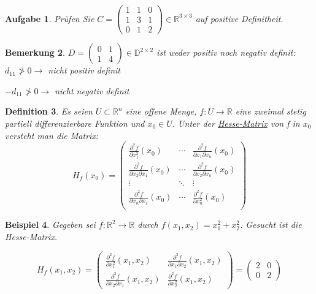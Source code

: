 \documentclass[12pt,a4paper]{scrreprt}
\newtheorem{defi}{Definition}[section]
\newtheorem{bemerkung}[defi]{Bemerkung}
\newtheorem{beispiel}[defi]{Beispiel}
\newtheorem{aufg}[defi]{Aufgabe}
\begin{document}
\begin{aufg}
	Prüfen Sie $C=\begin{pmatrix}
	1 & 1 & 0 \\ 1 & 3 & 1 \\ 0 & 1 & 2
	\end{pmatrix} \in \mathbb{R}^{3\times3}$ auf positive Definitheit.
\end{aufg}

\begin{bemerkung}
	$D=\begin{pmatrix}
	0 & 1 \\ 1 & 4
	\end{pmatrix} \in \mathbb{D}^{2\times2}$ ist weder positiv noch negativ definit: $d_{11}\not>0\to$ nicht positiv definit
	
	$-d_{11}\not>0\to$ nicht negativ definit
\end{bemerkung}

\begin{defi}
	Es seien $U\subset\mathbb{R}^n$ eine offene Menge, $f:U\to\mathbb{R}$ eine zweimal stetig partiell differenzierbare Funktion und $x_0\in U$. Unter der \underline{Hesse-Matrix} von f in $x_0$ versteht man die Matrix: \[H_f(x_0)=\begin{pmatrix}
	\frac{\partial^2 f}{\partial x_1^2}(x_0) & \cdots & \frac{\partial^2 f}{\partial x_1 \partial x_n}(x_0) \\
	\frac{\partial^2 f}{\partial x_2 \partial x_1}(x_0) & \cdots & \frac{\partial^2 f}{\partial x_2 \partial x_n}(x_0) \\
	\vdots & \ddots & \vdots \\
	\frac{\partial^2 f}{\partial x_n \partial x_1}(x_0) & \cdots & \frac{\partial^2 f}{\partial x_n^2}(x_0) \\
	\end{pmatrix}\]
\end{defi}

\begin{beispiel}
	Gegeben sei $f:\mathbb{R}^2\to\mathbb{R}$ durch $f(x_1,x_2)=x_1^2+x_2^2$. Gesucht ist die Hesse-Matrix.
	
	\[H_f(x_1,x_2)=\begin{pmatrix}
	\frac{\partial^2 f}{\partial x_1^2}(x_1,x_2)  & \frac{\partial^2 f}{\partial x_1 \partial x_2}(x_1,x_2) \\
	\frac{\partial^2 f}{\partial x_2 \partial x_1}(x_1,x_2) & \frac{\partial^2 f}{\partial x_2^2}(x_1,x_2)
	\end{pmatrix}=\begin{pmatrix}
	2 & 0 \\ 0 & 2
	\end{pmatrix}\]
\end{beispiel}
\end{document}
